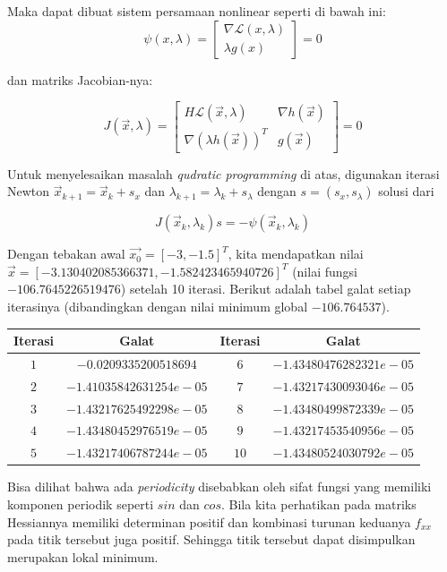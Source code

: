 \documentclass[11pt, a4paper, onecolumn, oneside, final]{report}
\begin{document}
Maka dapat dibuat sistem persamaan nonlinear seperti di bawah ini:
$$
\psi (x, \lambda) = \begin{bmatrix}
    \nabla \mathcal{L}(x, \lambda) \\
    \lambda g(x)
\end{bmatrix}  = 0
$$

dan matriks Jacobian-nya:

$$
J (\vec{x}, \lambda) = \begin{bmatrix}
    H \mathcal{L}(\vec{x}, \lambda) & \nabla h(\vec{x}) \\
    \nabla (\lambda h(\vec{x}))^T & g(\vec{x})
\end{bmatrix}  = 0
$$

Untuk menyelesaikan masalah \textit{qudratic programming} di atas, digunakan iterasi Newton $\vec{x}_{k+1} = \vec{x}_k + s_x$ dan $\lambda_{k+1} = \lambda_k + s_{\lambda}$ dengan $s = (s_x, s_\lambda)$ solusi dari

$$
J(\vec{x}_k, \lambda_k)s = - \psi (\vec{x}_k, \lambda_k)
$$

Dengan tebakan awal $\vec{x_0} = [-3, -1.5]^T$, kita mendapatkan nilai $\vec{x} = [-3.130402085366371, -1.582423465940726]^T$ (nilai fungsi $-106.7645226519476$) setelah 10 iterasi. Berikut adalah tabel galat setiap iterasinya (dibandingkan dengan nilai minimum global $-106.764537$).

\begin{table}[H]
\centering
\begin{tabular}{|c|c|c|c|}
\hline
\textbf{Iterasi} & \textbf{Galat} & \textbf{Iterasi} & \textbf{Galat}  \\ \hline
$1$ & $-0.0209335200518694$ & $6$ & $-1.43480476282321e-05$ \\ \hline
$2$ & $-1.41035842631254e-05$ & $7$ & $-1.43217430093046e-05$ \\ \hline
$3$ & $-1.43217625492298e-05$ & $8$ & $-1.43480499872339e-05$ \\ \hline
$4$ & $-1.43480452976519e-05$ & $9$ & $-1.43217453540956e-05$ \\ \hline
$5$ & $-1.43217406787244e-05$ & $10$ & $-1.43480524030792e-05$\\ \hline
\end{tabular}
\end{table}

Bisa dilihat bahwa ada \textit{periodicity} disebabkan oleh sifat fungsi yang memiliki komponen periodik seperti $sin$ dan $cos$. Bila kita perhatikan pada matriks Hessiannya memiliki determinan positif dan kombinasi turunan keduanya $f_{xx}$ pada titik tersebut juga positif. Sehingga titik tersebut dapat disimpulkan merupakan lokal minimum.
\end{document}
